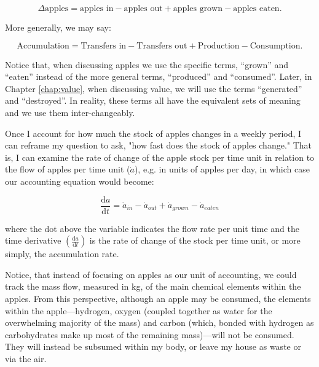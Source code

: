 \begin{equation}
	\Delta\textrm{apples} 
	= \textrm{apples in} 
	- \textrm{apples out} 
	+ \textrm{apples grown} 
	- \textrm{apples eaten}.
\end{equation}

\noindent More generally, we may say:

\begin{equation}
	\textrm{Accumulation}
	= \textrm{Transfers in} 
	- \textrm{Transfers out}
	+ \textrm{Production}
	- \textrm{Consumption}.
\end{equation}

Notice that, when discussing apples we use the specific terms, ``grown'' and
``eaten'' instead of the more general terms, ``produced'' and ``consumed''.
Later, in Chapter \ref{chap:value}, when discussing value, we will use the terms
``generated'' and ``destroyed''. In reality, these terms all have the equivalent
sets of meaning and we use them inter-changeably.

Once I account for how much the stock of apples changes in a weekly period,
I can reframe my question to ask, "how fast does the stock of
apples change." That is, I can examine the rate of
change of the apple stock per time unit in relation to the flow of apples per time unit ($\dot{a}$), 
e.g. in units of apples per day, 
in which case our accounting equation would become:

\begin{equation} \label{eq:apple_rate_accounting}
	\frac{\mathrm{d}a}{\mathrm{d}t}
	= \dot{a}_{in}
	- \dot{a}_{out}
	+ \dot{a}_{grown}
	- \dot{a}_{eaten}
\end{equation}

\noindent where the dot above the variable indicates the flow rate per unit time and
the time derivative $\left( \frac{\mathrm{d}a}{\mathrm{d}t} \right)$ 
is the rate of change of the stock per time unit, or more simply,
 the accumulation rate.
 

Notice, that instead of focusing on apples as our unit of accounting, we
could track the mass flow, measured in kg, of the main chemical elements
within the apples. From this perspective, although an apple may be consumed,
the elements within the apple---hydrogen, oxygen (coupled together as water
for the overwhelming majority of the mass) and carbon (which, bonded with
hydrogen as carbohydrates make up most of the remaining mass)---will not be
consumed. They will instead be subsumed within my body, or leave my house as
waste or via the air.

